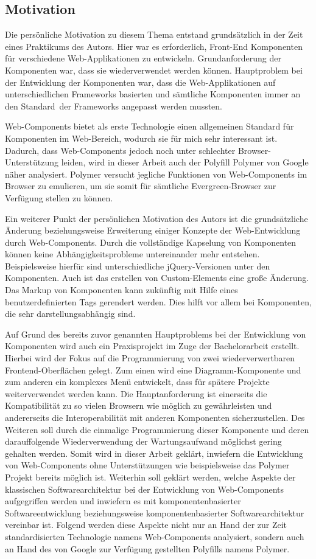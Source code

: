 \subsection{Motivation}
\label{sec:1_Motivation}

Die persönliche Motivation zu diesem Thema entstand grundsätzlich in der Zeit eines Praktikums des Autors. Hier war es erforderlich, Front-End Komponenten für verschiedene Web-Applikationen zu entwickeln. Grundanforderung der Komponenten war, dass sie wiederverwendet werden können. Hauptproblem bei der Entwicklung der Komponenten war, dass die Web-Applikationen auf unterschiedlichen Frameworks basierten und sämtliche Komponenten immer an den \glqq Standard\grqq\ der Frameworks angepasst werden mussten.

Web-Components bietet als erste Technologie einen allgemeinen Standard für Komponenten im Web-Bereich, wodurch sie für mich sehr interessant ist. Dadurch, dass Web-Components jedoch noch unter schlechter Browser-Unterstützung leiden, wird in dieser Arbeit auch der Polyfill Polymer von Google näher analysiert. Polymer versucht jegliche Funktionen von Web-Components im Browser zu emulieren, um sie somit für sämtliche \glqq Evergreen\grqq -Browser zur Verfügung stellen zu können.

Ein weiterer Punkt der persönlichen Motivation des Autors ist die grundsätzliche Änderung beziehungsweise Erweiterung einiger Konzepte der Web-Entwicklung durch Web-Components. Durch die vollständige Kapselung von Komponenten können keine Abhängigkeitsprobleme untereinander mehr entstehen. Beispielsweise hierfür sind unterschiedliche jQuery-Versionen unter den Komponenten. Auch ist das erstellen von Custom-Elements eine große Änderung. Das Markup von Komponenten kann zukünftig mit Hilfe eines benutzerdefinierten Tags gerendert werden. Dies hilft vor allem bei Komponenten, die sehr darstellungsabhängig sind.

Auf Grund des bereits zuvor genannten Hauptproblems bei der Entwicklung von Komponenten wird auch ein Praxisprojekt im Zuge der Bachelorarbeit erstellt. Hierbei wird der Fokus auf die Programmierung von zwei wiederverwertbaren Frontend-Oberflächen gelegt. Zum einen wird eine Diagramm-Komponente und zum anderen ein komplexes Menü entwickelt, dass für spätere Projekte weiterverwendet werden kann. Die Hauptanforderung ist einerseits die Kompatibilität zu so vielen Browsern wie möglich zu gewährleisten und andererseits die Interoperabilität mit anderen Komponenten sicherzustellen. Des Weiteren soll durch die einmalige Programmierung dieser Komponente und deren darauffolgende Wiederverwendung der Wartungsaufwand möglichst gering gehalten werden. Somit wird in dieser Arbeit geklärt, inwiefern die Entwicklung von Web-Components ohne Unterstützungen wie beispielsweise das Polymer Projekt bereits möglich ist. Weiterhin soll geklärt werden, welche Aspekte der klassischen Softwarearchitektur bei der Entwicklung von Web-Components aufgegriffen werden und inwiefern es mit komponentenbasierter Softwareentwicklung beziehungsweise komponentenbasierter Softwarearchitektur vereinbar ist. Folgend werden diese Aspekte nicht nur an Hand der zur Zeit standardisierten Technologie namens Web-Components analysiert, sondern auch an Hand des von Google zur Verfügung gestellten Polyfills namens Polymer.

